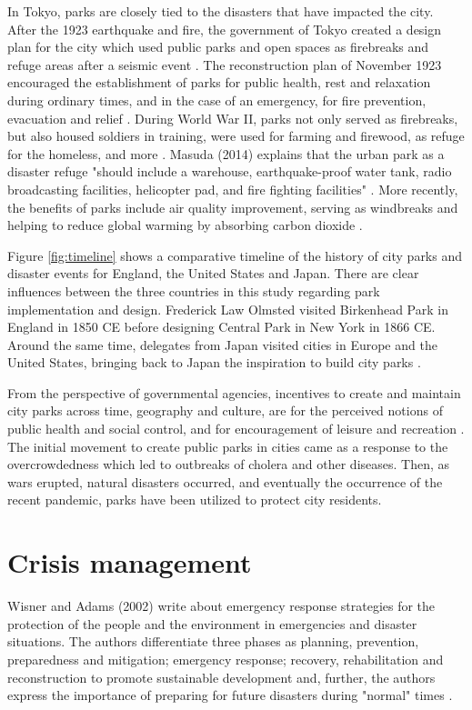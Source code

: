 \begin{multicols}{2}

In Tokyo, parks are closely tied to the disasters that have impacted the city. After the 1923 earthquake and fire, the government of Tokyo created a design plan for the city which used public parks and open spaces as firebreaks and refuge areas after a seismic event \cite{masuda_disaster_2014}. The reconstruction plan of November 1923 encouraged the establishment of parks for public health, rest and relaxation during ordinary times, and in the case of an emergency, for fire prevention, evacuation and relief \cite{havens_parkscapes_2011}. During World War II, parks not only served as firebreaks, but also housed soldiers in training, were used for farming and firewood, as refuge for the homeless, and more \cite{havens_parkscapes_2011}. Masuda (2014) explains that the urban park as a disaster refuge "should include a warehouse, earthquake-proof water tank, radio broadcasting facilities, helicopter pad, and fire fighting facilities" \cite{masuda_disaster_2014}. More recently, the benefits of parks include air quality improvement, serving as windbreaks and helping to reduce global warming by absorbing carbon dioxide \cite{havens_parkscapes_2011}.

Figure \ref{fig:timeline} shows a comparative timeline of the history of city parks and disaster events for England, the United States and Japan. There are clear influences between the three countries in this study regarding park implementation and design. Frederick Law Olmsted visited Birkenhead Park in England in 1850 CE before designing Central Park in New York in 1866 CE. Around the same time, delegates from Japan visited cities in Europe and the United States, bringing back to Japan the inspiration to build city parks \cite{havens_parkscapes_2011}.

From the perspective of governmental agencies, incentives to create and maintain city parks across time, geography and culture, are for the perceived notions of public health and social control, and for encouragement of leisure and recreation \cite{jones_lungs_2018}\cite{cranz_politics_1989}\cite{havens_parkscapes_2011}. The initial movement to create public parks in cities came as a response to the overcrowdedness which led to outbreaks of cholera and other diseases. Then, as wars erupted, natural disasters occurred, and eventually the occurrence of the recent pandemic, parks have been utilized to protect city residents.

\section{Crisis management}
Wisner and Adams (2002) write about emergency response strategies for the protection of the people and the environment in emergencies and disaster situations. The authors differentiate three phases as planning, prevention, preparedness and mitigation; emergency response; recovery, rehabilitation and reconstruction to promote sustainable development and, further, the authors express the importance of preparing for future disasters during "normal" times \cite{wisner_environmental_2002}.


\end{multicols}
